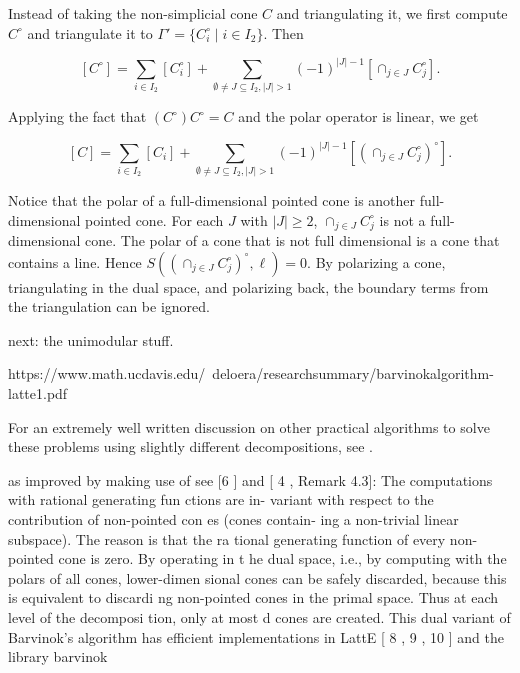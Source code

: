 Instead of taking the non-simplicial cone $C$ and triangulating it, we first compute $C^\circ$ and triangulate it to $\Gamma' = \{C_i^\circ \mid i \in I_2 \}$. Then

 \[ [C^\circ] = \sum_{i \in I_2} [C_i^\circ] + \sum_{\emptyset \neq J \subseteq I_2, |J| > 1} (-1)^{|J|-1} [\cap_{j \in J} C_j^\circ].\]
 
 Applying the fact that $(C^\circ)C^\circ = C$ and the polar operator is linear, we get
 
  \[ [C] = \sum_{i \in I_2} [C_i] + \sum_{\emptyset \neq J \subseteq I_2, |J| > 1} (-1)^{|J|-1} [(\cap_{j \in J} C_j^\circ)^\circ].\]
  

Notice that the polar of a full-dimensional pointed cone is another full-dimensional pointed cone. For each $J$ with $|J| \geq 2$, $\cap_{j \in J} C_j^\circ$ is not a full-dimensional cone. The polar of a cone that is not full dimensional is a cone that contains a line. Hence $S((\cap_{j \in J} C_j^\circ)^\circ, \ell) = 0$. By polarizing a cone, triangulating in the dual space, and polarizing back, the boundary terms from the triangulation can be ignored. 



next: the unimodular stuff. 

https://www.math.ucdavis.edu/~deloera/researchsummary/barvinokalgorithm-latte1.pdf


For an extremely well written discussion on other practical algorithms to solve these problems using slightly different decompositions, see \cite{koeppe:irrational-barvinok}. 

as improved by making use of
see [6
] and [
4
,
Remark 4.3]: The computations with rational generating fun
ctions are in-
variant with respect to the contribution of non-pointed con
es (cones contain-
ing a non-trivial linear subspace). The reason is that the ra
tional generating
function of every non-pointed cone is zero. By operating in t
he dual space,
i.e., by computing with the polars of all cones, lower-dimen
sional cones can
be safely discarded, because this is equivalent to discardi
ng non-pointed
cones in the primal space. Thus at each level of the decomposi
tion, only
at most
d
cones are created. This
dual variant
of Barvinok’s algorithm has
efficient implementations in LattE [
8
,
9
,
10
] and the library
barvinok


